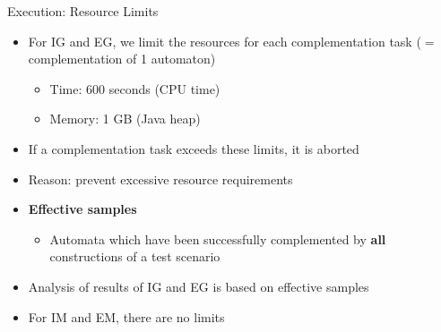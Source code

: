 \documentclass[12pt]{beamer}
\newcommand{\fat}[1]{\textbf{#1}}
\begin{document}
\begin{frame}{Execution: Resource Limits}
\begin{itemize}\itemsep6pt
\item For IG and EG, we limit the resources for each complementation task ($=$ complementation of 1 automaton)
  \begin{itemize}
  \item Time:   \tabto{1.6cm} 600 seconds (CPU time)
  \item Memory: \tabto{1.6cm} 1 GB (Java heap)
  \end{itemize}
\pause
\item If a complementation task exceeds these limits, it is aborted
\pause
\item Reason: prevent excessive resource requirements %
\pause
\item \fat{Effective samples}
  \begin{itemize}
  \item Automata which have been successfully complemented by \fat{all} constructions of a test scenario
  \end{itemize}
\item Analysis of results of IG and EG is based on effective samples
\pause
\item For IM and EM, there are no limits
\end{itemize}
\end{frame}
\end{document}
